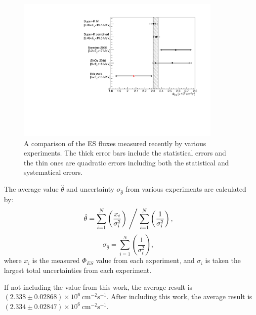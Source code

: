 \begin{figure}[!htb]
	\centering
	\includegraphics[width=10cm]{ESfluxCompare.pdf}
	\caption[A comparison of the ES flux measured recently by various experiments.]{A comparison of the ES fluxes measured recently by various experiments. The thick error bars include the statistical errors and the thin ones are quadratic errors including both the statistical and systematical errors.}
	\label{fig:ESfluxCompare}
\end{figure}

The average value $\hat \theta$ and uncertainty $\sigma_{\hat\theta}$ from various experiments are calculated by\cite{behnke2013data}:
\begin{equation}
\hat \theta = \sum_{i=1}^{N} \left(\frac{x_i}{\sigma_i^2}\right)\Biggm/\sum_{i=1}^{N}\left(\frac{1}{\sigma_i^2}\right),
\end{equation}
\begin{equation}
\sigma_{\hat\theta} = \sum_{i=1}^{N}\left(\frac{1}{\sigma_i^2}\right),
\end{equation}
where $x_i$ is the measured $\Phi_{ES}$ value from each experiment, and $\sigma_i$ is taken the largest total uncertainties from each experiment.

If not including the value from this work, the average result is $(2.338 \pm 0.02868)\times  10^6~\mathrm{cm^{-2}s^{-1}}$. After including this work, the average result is  
$(2.334\pm0.02847)\times 10^6~\mathrm{cm^{-2}s^{-1}}$.



